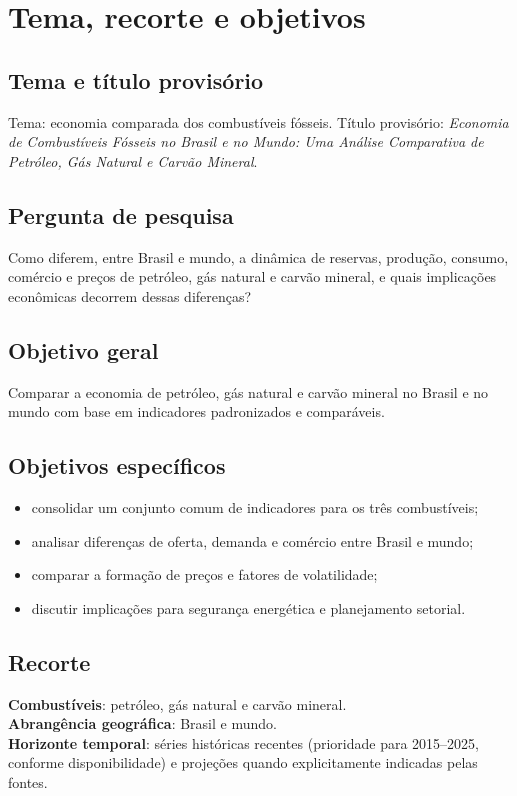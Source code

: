 \section{Tema, recorte e objetivos}

\subsection{Tema e t\'itulo provis\'orio}
Tema: economia comparada dos combust\'iveis f\'osseis. T\'itulo provis\'orio: \emph{Economia de Combust\'iveis F\'osseis no Brasil e no Mundo: Uma An\'alise Comparativa de Petr\'oleo, G\'as Natural e Carv\~ao Mineral}.

\subsection{Pergunta de pesquisa}
Como diferem, entre Brasil e mundo, a din\^amica de reservas, produ\c{c}\~ao, consumo, com\'ercio e pre\c{c}os de petr\'oleo, g\'as natural e carv\~ao mineral, e quais implica\c{c}\~oes econ\^omicas decorrem dessas diferen\c{c}as?

\subsection{Objetivo geral}
Comparar a economia de petr\'oleo, g\'as natural e carv\~ao mineral no Brasil e no mundo com base em indicadores padronizados e compar\'aveis.

\subsection{Objetivos espec\'ificos}
\begin{itemize}
  \item consolidar um conjunto comum de indicadores para os tr\^es combust\'iveis;
  \item analisar diferen\c{c}as de oferta, demanda e com\'ercio entre Brasil e mundo;
  \item comparar a forma\c{c}\~ao de pre\c{c}os e fatores de volatilidade;
  \item discutir implica\c{c}\~oes para seguran\c{c}a energ\'etica e planejamento setorial.
\end{itemize}

\subsection{Recorte}
\textbf{Combust\'iveis}: petr\'oleo, g\'as natural e carv\~ao mineral. \\
\textbf{Abrang\^encia geogr\'afica}: Brasil e mundo. \\
\textbf{Horizonte temporal}: s\'eries hist\'oricas recentes (prioridade para 2015--2025, conforme disponibilidade) e proje\c{c}\~oes quando explicitamente indicadas pelas fontes.

